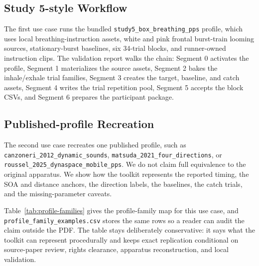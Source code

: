 \documentclass[pdflatex,sn-apa]{sn-jnl}
\newcommand{\code}[1]{\texttt{#1}}
\begin{document}
\subsection{Study 5-style Workflow}

The first use case runs the bundled \code{study5\_box\_breathing\_pps} profile, which uses local breathing-instruction assets, white and pink frontal burst-train looming sources, stationary-burst baselines, six 34-trial blocks, and runner-owned instruction clips. The validation report walks the chain: Segment 0 activates the profile, Segment 1 materializes the source assets, Segment 2 bakes the inhale/exhale trial families, Segment 3 creates the target, baseline, and catch assets, Segment 4 writes the trial repetition pool, Segment 5 accepts the block CSVs, and Segment 6 prepares the participant package.

\subsection{Published-profile Recreation}

The second use case recreates one published profile, such as \code{canzoneri\_2012\_dynamic\_sounds}, \code{matsuda\_2021\_four\_directions}, or \code{roussel\_2025\_dynaspace\_mobile\_pps}. We do not claim full equivalence to the original apparatus. We show how the toolkit represents the reported timing, the SOA and distance anchors, the direction labels, the baselines, the catch trials, and the missing-parameter caveats.

Table~\ref{tab:profile-families} gives the profile-family map for this use case, and \code{profile\_family\_examples.csv} stores the same rows so a reader can audit the claim outside the PDF. The table stays deliberately conservative: it says what the toolkit can represent procedurally and keeps exact replication conditional on source-paper review, rights clearance, apparatus reconstruction, and local validation.
\end{document}
